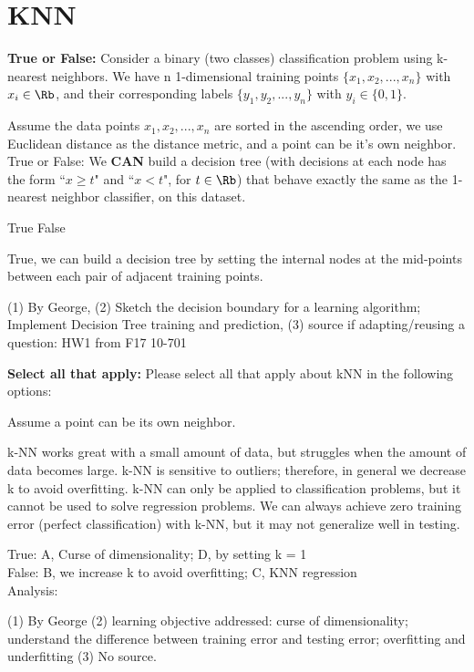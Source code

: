 \section{KNN}
\begin{questions}
\question[] \textbf{True or False:} Consider a binary (two classes) classification problem using k-nearest neighbors. We have n 1-dimensional training points $\{x_1,x_2,...,x_n\}$ with $x_i \in \Rb$, and their corresponding labels $\{y_1, y_2, ..., y_n\}$ with $y_i \in \{0,1\}$. 

Assume the data points $x_1,x_2,...,x_n$ are sorted in the ascending order, we use Euclidean distance as the distance metric, and a point can be it's own neighbor. True or False: We \textbf{CAN} build a decision tree (with decisions at each node has the form ``$x \geq t$" and ``$x < t$", for $t \in \Rb$) that behave exactly the same as the 1-nearest neighbor classifier, on this dataset.

    \begin{checkboxes}
     \choice True 
     \choice False
    \end{checkboxes}
    \begin{soln}
    True, we can build a decision tree by setting the internal nodes at the mid-points between each pair of adjacent training points.
    \end{soln}
    \begin{qauthor}
    (1) By George, (2) Sketch the decision boundary for a learning algorithm; 
    Implement Decision Tree training and prediction, (3) source if  adapting/reusing a question: HW1 from F17 10-701
    \end{qauthor}

\question [] \textbf{Select all that apply:} Please select all that apply about kNN in the following options: 

Assume a point can be its own neighbor.

    {%
    \checkboxchar{$\Box$} %
    \begin{checkboxes}
     \choice k-NN works great with a small amount of data, but struggles when the amount of data becomes large. 
     \choice k-NN is sensitive to outliers; therefore, in general we decrease k to avoid overfitting.
     \choice k-NN can only be applied to classification problems, but it cannot be used to solve regression problems.
     \choice We can always achieve zero training error (perfect classification) with k-NN, but it may not generalize well in testing.
    \end{checkboxes}
    }
    \begin{soln}
    True: A, Curse of dimensionality; D, by setting k = 1\\
    False: B, we increase k to avoid overfitting; C, KNN regression\\
    Analysis:
    \end{soln}
    \begin{qauthor}
    (1) By George
    (2) learning objective addressed: curse of dimensionality; understand the difference between training error and testing error; overfitting and underfitting
    (3) No source.
    \end{qauthor}


\end{questions}
